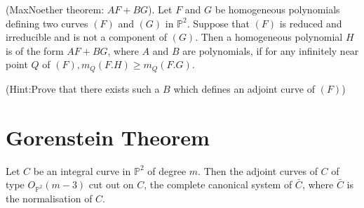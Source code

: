 \begin{exer*}
(Max\pageoriginale Noether theorem: $AF+BG$). Let $F$ and $G$ be
  homogeneous polynomials defining two curves $(F)$ and $(G)$ in
  $\mathbb{P}^2$. Suppose that $(F)$ is reduced and irreducible and is
  not a component of $(G)$. Then a homogeneous polynomial $H$ is of
  the form $AF+BG$, where $A$ and $B$ are polynomials, if for any
  infinitely near point $Q$ of $(F), m_Q(F.H)\geq m_Q(F.G)$.  
\end{exer*}

(Hint:Prove that there exists such a $B$ which defines an adjoint
curve of $(F)$)

\section{Gorenstein Theorem}\label{chap2:sec8}
\begin{THM*}
Let $C$ be an integral curve in $\mathbb{P}^2$ of degree $m$. Then the
adjoint curves of $C$ of type $O_{\mathbb{P}^2}(m-3)$ cut out on $C$,
the complete canonical system of $\bar{C}$, where $\bar{C}$ is the
normalisation of $C$.
\end{THM*}

